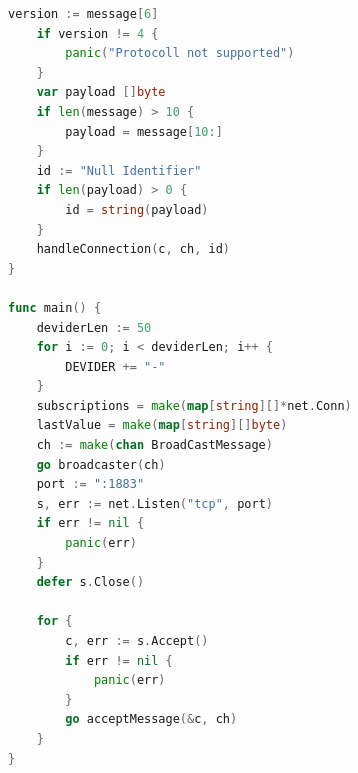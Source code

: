 \documentclass{article}
\begin{document}
\begin{appendices}
\begin{lstlisting}[language=go]
	version := message[6]
	if version != 4 {
		panic("Protocoll not supported")
	}
	var payload []byte
	if len(message) > 10 {
		payload = message[10:]
	}
	id := "Null Identifier"
	if len(payload) > 0 {
		id = string(payload)
	}
	handleConnection(c, ch, id)
}

func main() {
	deviderLen := 50
	for i := 0; i < deviderLen; i++ {
		DEVIDER += "-"
	}
	subscriptions = make(map[string][]*net.Conn)
	lastValue = make(map[string][]byte)
	ch := make(chan BroadCastMessage)
	go broadcaster(ch)
	port := ":1883"
	s, err := net.Listen("tcp", port)
	if err != nil {
		panic(err)
	}
	defer s.Close()

	for {
		c, err := s.Accept()
		if err != nil {
			panic(err)
		}
		go acceptMessage(&c, ch)
	}
}

        \end{lstlisting}

    \end{appendices}
\end{document}
